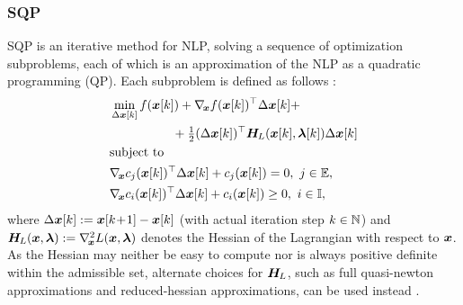 \documentclass[journal]{IEEEtranTIE}
\begin{document}
\subsubsection{SQP}

SQP is an iterative method for NLP, solving a sequence of optimization subproblems, each of which is an approximation of the NLP as a quadratic programming (QP). Each subproblem is defined as follows \cite{jorge2006numerical}:
\begin{subequations}\label{eq:SQP}
\begin{align}
\small
&\mathop {\min }\limits_{\Delta\mv{x}[k]} f(\mv{x}[k]) + \nabla_{\!\mv{x}} f{(\mv{x}[k])^\top}\Delta\mv{x}[k]+  \nonumber \\ 
& \qquad \qquad \quad +\tfrac{1}{2}{(\Delta\mv{x}[k])^\top}\mm{H}_{\!L}(\mv{x}[k],\mv{\lambda}[k])\Delta\mv{x}[k]\\ 
&{\rm{subject\ to}} \nonumber \\
&\nabla_{\!\mv{x}} {c_j}{(\mv{x}[k])^\top}\Delta\mv{x}[k] + {c_j}(\mv{x}[k]) = 0,\ j \in \mathbb{E},\\
&\nabla_{\!\mv{x}} {c_i}{(\mv{x}[k])^\top}\Delta\mv{x}[k] + {c_i}(\mv{x}[k]) \ge 0,\ i \in \mathbb{I},
\end{align}
\end{subequations}
where $\Delta\boldsymbol{x}[k] := \boldsymbol{x}[k\!+\!1] - \boldsymbol{x}[k]$ (with actual iteration step $k\in \mathbb{N}$) and $\boldsymbol{H}_{\!L}(\boldsymbol{x},\boldsymbol{\lambda}) := \nabla_{\!\boldsymbol{x}}^2L(\boldsymbol{x},\boldsymbol{\lambda})$  denotes the Hessian  of the Lagrangian with respect to $\boldsymbol{x}$. As the Hessian may neither be easy to compute nor is always positive definite within the admissible set, alternate choices for $\boldsymbol{H}_{\!L}$, such as full quasi-newton approximations and reduced-hessian approximations, can be used instead \cite{jorge2006numerical}.
\end{document}

